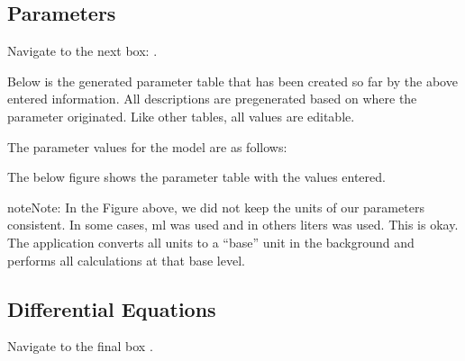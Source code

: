 \documentclass[letterpaper,10pt,english]{sphinxmanual}
\begin{document}
\subsection{Parameters}
\label{\detokenize{pages/tutorial_mc/parameters:parameters}}\label{\detokenize{pages/tutorial_mc/parameters::doc}}
\sphinxAtStartPar
Navigate to the next box: .

\sphinxAtStartPar
Below is the generated parameter table that has been created so far by the
above entered information. All descriptions are pregenerated based on where
the parameter originated. Like other tables, all values are editable.

\begin{figure}[htbp]
\centering

\noindent{}
\end{figure}

\sphinxAtStartPar
The parameter values for the model are as follows:

\begin{figure}[htbp]
\centering

\noindent{}
\end{figure}

\sphinxAtStartPar
The below figure shows the parameter table with the values entered.

\begin{figure}[htbp]
\centering

\noindent{}
\end{figure}

\begin{sphinxadmonition}{note}{Note:}
\sphinxAtStartPar
In the Figure above, we did not keep the units of our parameters
consistent. In some cases, ml was used and in others liters was used.
This is okay.  The application converts all units to a “base” unit
in the background and performs all calculations at that base level.
\end{sphinxadmonition}


\subsection{Differential Equations}
\label{\detokenize{pages/tutorial_mc/differentialEquations:differential-equations}}\label{\detokenize{pages/tutorial_mc/differentialEquations::doc}}
\sphinxAtStartPar
Navigate to the final box .
\end{document}
